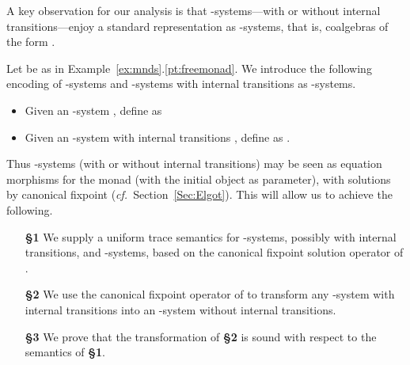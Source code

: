 \documentclass[oribibl,envcountsame,envcountsect,runningheads]{llncs}
\renewcommand{\>}{\rangle}
\begin{document}
A key observation for our analysis is that -systems---with or without internal transitions---enjoy a standard representation as -systems, that is, coalgebras of the form .
\begin{definition} \label{def:reprHtofreeH} Let  be as in Example~\ref{ex:mnds}.\ref{pt:freemonad}. We introduce the following encoding  of -systems and -systems with internal transitions as -systems.
\begin{itemize}
  \item Given an -system , define  as

\item Given an -system with internal transitions , define  as .
  \end{itemize}
\end{definition}
Thus -systems (with or without internal transitions) may be seen as equation morphisms  for the monad  (with the initial object  as parameter), with solutions by canonical fixpoint ({\em cf.}~Section~\ref{Sec:Elgot}). This will allow us to achieve the following.
\begin{enumerate}[label={(\arabic*)}]
  \item[\bf \S 1] We supply a uniform trace semantics for -systems, possibly with internal transitions, and -systems, based on the canonical fixpoint solution operator of . \item[\bf \S 2] We use the canonical fixpoint operator of  to transform any -system  with internal transitions into an -system  without internal transitions. \item[\bf \S 3] We prove that the transformation of {\bf \S 2} is sound with respect to the semantics of {\bf \S 1}.
\end{enumerate}
\end{document}
